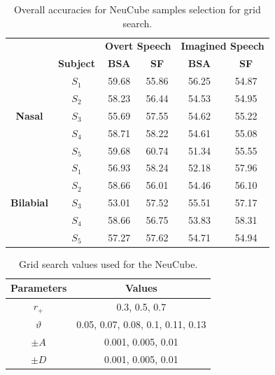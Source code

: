 \begin{table}[h!]
	\centering
	\caption{Overall accuracies for NeuCube samples selection for grid search.}
	\begin{tabular}{|*{6}{c|}}
		\cline{3-6}
		\multicolumn{2}{c|}{\multirow{1}{*}{}} & \multicolumn{2}{c|}{\textbf{Overt Speech}} & \multicolumn{2}{c|}{\textbf{Imagined Speech}} \\\cline{2-6}
		\multicolumn{1}{c|}{\multirow{1}{*}{}}  & \textbf{Subject} & \textbf{BSA} & \textbf{SF} & \textbf{BSA} & \textbf{SF} \\\hline
		\multirow{5}{*}{\begin{sideways}\textbf{Nasal}\end{sideways}} & $S_{1}$    & 59.68 & 55.86 & 56.25 & 54.87 \\\cline{2-6}
		& $S_{2}$    & 58.23 & 56.44 & 54.53 & 54.95 \\\cline{2-6}
		& $S_{3}$    & 55.69 & 57.55 & 54.62 & 55.22 \\\cline{2-6}
		& $S_{4}$    & 58.71 & 58.22 & 54.61 & 55.08 \\\cline{2-6}
		& \cellcolor{orange}$S_{5}$    & 59.68 & \cellcolor{orange}60.74 & 51.34 & 55.55 \\\hline
		\multirow{5}{*}{\begin{sideways}\textbf{Bilabial}\end{sideways}} & $S_{1}$    & 56.93 & 58.24 & 52.18 & 57.96 \\\cline{2-6}
		& $S_{2}$    & 58.66 & 56.01 & 54.46 & 56.10 \\\cline{2-6}
		& $S_{3}$    & 53.01 & 57.52 & 55.51 & 57.17 \\\cline{2-6}
		& \cellcolor{orange}$S_{4}$    & 58.66 & 56.75 & 53.83 & \cellcolor{orange}58.31 \\\cline{2-6}
		& $S_{5}$    & 57.27 & 57.62 & 54.71 & 54.94 \\\hline
	\end{tabular}%
	\label{Table: NeuCube_TestSelection}%
\end{table}%

\begin{table}[h!]
\caption{Grid search values used for the NeuCube.}
\centering
\begin{tabular}{|c|c|}\hline
	\textbf{Parameters}&\textbf{Values}\\\hline
	$r_{+}$&{0.3, 0.5, 0.7}\\\hline
	$\vartheta$&{0.05, 0.07, 0.08, 0.1, 0.11, 0.13}\\\hline
	$\pm A$&{0.001, 0.005, 0.01}\\\hline
	$\pm D$&{0.001, 0.005, 0.01}\\\hline
\end{tabular}
\label{Table: NeuCube_Gridsearch}
\end{table}

